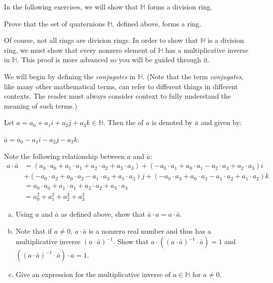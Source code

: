 In the following exercises, we will show that ${\mathbb H}$ forms a division ring.

\begin{exercise}
Prove that the set of quaternions ${\mathbb H}$, defined above, forms a ring.
\end{exercise}

Of course, not all rings are division rings.  In order to show that ${\mathbb H}$ is a division ring, we must show that every nonzero element of ${\mathbb H}$ has a multiplicative inverse in ${\mathbb H}$.  This proof is more advanced so you will be guided through it.  

We will begin by defining the \emph{conjugates} in ${\mathbb H}$.  (Note that the term \emph{conjugates}, like many other mathematical terms, can refer to different things in different contexts.  The reader must always consider context to fully understand the meaning of such terms.)

\begin{defn}
Let $a=a_0+a_1i+a_2j+a_3k\in{\mathbb H}$.  Then the  of $a$ is denoted by $\bar{a}$ and given by:
\begin{center}
$\bar{a}=a_0-a_1i-a_2j-a_3k$.
\end{center}
\end{defn}

Note the following relationship between $a$ and $\bar{a}$:
\begin{align*}
a\cdot \bar{a}&=(a_0\cdot a_0+a_1\cdot a_1+a_2\cdot a_2+a_3\cdot a_3)+(-a_0\cdot a_1+a_0\cdot a_1-a_2\cdot a_3+a_2\cdot a_3)i\\
&+(-a_0\cdot a_2+a_0\cdot a_2-a_1\cdot a_3+a_1\cdot a_3)j+(-a_0\cdot a_3+a_0\cdot a_3-a_1\cdot a_2+a_1\cdot a_2)k\\
&=a_0\cdot a_0+a_1\cdot a_1+a_2\cdot a_2+a_3\cdot a_3\\
&=a_0^2+a_1^2+a_2^2+a_3^2
\end{align*}

\begin{exercise}
\begin{enumerate}[(a)]
\item Using $a$ and $\bar{a}$ as defined above, show that $\bar{a}\cdot a=a\cdot\bar{a}$.
\item Note that if $a\neq 0$, $a\cdot \bar{a}$ is a nonzero real number and thus has a multiplicative inverse $(a\cdot \bar{a})^{-1} $. Show that $a\cdot\left( (a\cdot \bar{a})^{-1}\cdot \bar{a}\right)=1$ and $\left( (a\cdot \bar{a})^{-1}\cdot \bar{a}\right)\cdot a=1$.
\item Give an expression for the multiplicative inverse of $a\in{\mathbb H}$ for $a\neq 0$.
\end{enumerate}
\end{exercise}

